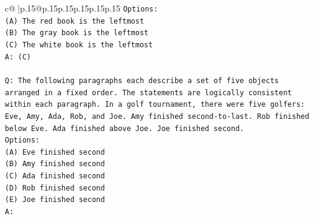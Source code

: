 \documentclass{article}
\begin{document}
{\begin{supertabular}{c@{$\;$}|p{.15\linewidth}@{}p{.15\linewidth}p{.15\linewidth}p{.15\linewidth}p{.15\linewidth}p{.15\linewidth}}
{{{\texttt{Options:} \\
\texttt{(A) The red book is the leftmost} \\
\texttt{(B) The gray book is the leftmost} \\
\texttt{(C) The white book is the leftmost} \\
\texttt{A: (C)} \\
\\ 
\texttt{Q: The following paragraphs each describe a set of five objects arranged in a fixed order. The statements are logically consistent within each paragraph. In a golf tournament, there were five golfers: Eve, Amy, Ada, Rob, and Joe. Amy finished second{-}to{-}last. Rob finished below Eve. Ada finished above Joe. Joe finished second.} \\
\texttt{Options:} \\
\texttt{(A) Eve finished second} \\
\texttt{(B) Amy finished second} \\
\texttt{(C) Ada finished second} \\
\texttt{(D) Rob finished second} \\
\texttt{(E) Joe finished second} \\
\texttt{A:} \\
            }
        }
    }
     \\ \\


\end{supertabular}}
\end{document}
